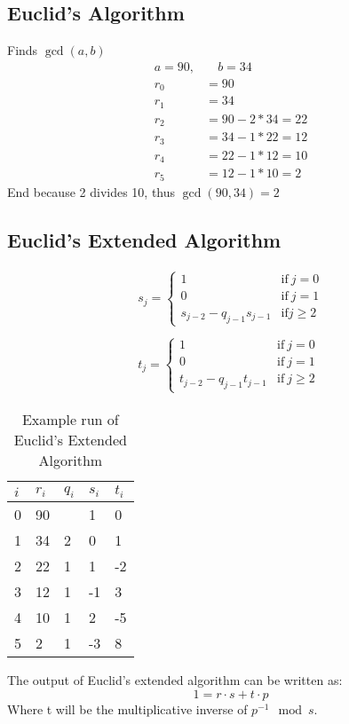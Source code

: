 
\subsection{Euclid's Algorithm}
\label{sec:euclids-algorithm}
Finds $\gcd(a, b)$
\begin{align*}
  a = 90,&\quad b = 34 \\
  r_0 &= 90\\
  r_1 &= 34\\
  r_2 &= 90 - 2*34 = 22\\
  r_3 &= 34 - 1*22 = 12\\
  r_4 &= 22 - 1*12 = 10\\
  r_5 &= 12 - 1*10 = 2
\end{align*}
End because 2 divides 10, thus $\gcd(90, 34) = 2$

\subsection{Euclid's Extended Algorithm}
\label{sec:euclids-extended}
\begin{align*}
  s_j = \begin{cases}
    1 &\text{if}\ j = 0\\
    0 &\text{if}\ j = 1\\
    s_{j-2} - q_{j-1}s_{j-1} &\mbox{if} j \ge 2
  \end{cases}\\ \\
  t_j = \begin{cases}
    1 &\text{if}\ j = 0\\
    0 &\text{if}\ j = 1\\
    t_{j-2} - q_{j-1}t_{j-1} &\text{if}\ j \ge 2
  \end{cases}
\end{align*}

\begin{table}[H]
  \centering
  \begin{tabular}{lllll}
    $i$ & $r_i$ & $q_i$ & $s_i$ & $t_i$ \\ \hline
    0   & 90    &       & 1     & 0     \\
    1   & 34    & 2     & 0     & 1     \\
    2   & 22    & 1     & 1     & -2    \\
    3   & 12    & 1     & -1    & 3     \\
    4   & 10    & 1     & 2     & -5    \\
    5   & 2     & 1     & -3    & 8     \\
  \end{tabular}
  \caption{Example run of Euclid's Extended Algorithm}
\end{table}
The output of Euclid's extended algorithm can be written as:
\[ 1 = r \cdot s + t \cdot p\]
Where t will be the multiplicative inverse of $p^{-1} \mod s$.

